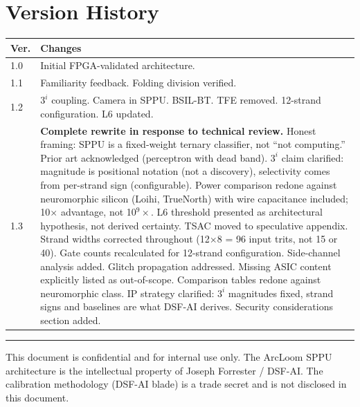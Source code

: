 \documentclass[11pt, a4paper]{article}
\begin{document}
\section{Version History}

\begin{center}
\begin{tabular}{@{}lp{10cm}@{}}
\toprule
\textbf{Ver.} & \textbf{Changes} \\
\midrule
1.0 & Initial FPGA-validated architecture. \\
1.1 & Familiarity feedback. Folding division verified. \\
1.2 & $3^i$ coupling. Camera in SPPU. BSIL-BT. TFE removed.
      12-strand configuration. L6 updated. \\
1.3 & \textbf{Complete rewrite in response to technical review.}
      Honest framing: SPPU is a fixed-weight ternary classifier,
      not ``not computing.'' Prior art acknowledged (perceptron
      with dead band). $3^i$ claim clarified: magnitude is
      positional notation (not a discovery), selectivity comes
      from per-strand sign (configurable). Power comparison
      redone against neuromorphic silicon (Loihi, TrueNorth)
      with wire capacitance included; 10$\times$ advantage, not
      10$^9\times$. L6 threshold presented as architectural
      hypothesis, not derived certainty. TSAC moved to
      speculative appendix. Strand widths corrected throughout
      (12$\times$8 = 96 input trits, not 15 or 40). Gate counts
      recalculated for 12-strand configuration. Side-channel
      analysis added. Glitch propagation addressed. Missing ASIC
      content explicitly listed as out-of-scope. Comparison
      tables redone against neuromorphic class. IP strategy
      clarified: $3^i$ magnitudes fixed, strand signs and
      baselines are what DSF-AI derives. Security considerations
      section added. \\
\bottomrule
\end{tabular}
\end{center}

\vspace{2em}
\hrule
\vspace{0.5em}
{\color{tfe-gray}\small This document is confidential and for
internal use only. The ArcLoom SPPU architecture is the
intellectual property of Joseph Forrester / DSF-AI. The
calibration methodology (DSF-AI blade) is a trade secret and is
not disclosed in this document.}
\end{document}
